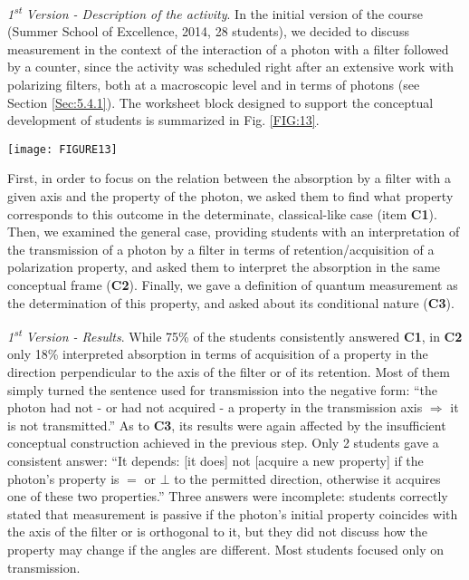 \documentclass[twocolumn,secnumarabic,amssymb, nobibnotes, aps, prd, nofootinbib]{revtex4-2}
\begin{document}
\emph{1\textsuperscript{st} Version - Description of the activity}. In the initial version of the course (Summer School of Excellence, 2014, 28 students), we decided to discuss measurement in the context of the interaction of a photon with a filter followed by a counter, since the activity was scheduled right after an extensive work with polarizing filters, both at a macroscopic level and in terms of photons (see Section \ref{Sec:5.4.1}). The worksheet block designed to support the conceptual development of students is summarized in Fig. \ref{FIG:13}.
\begin{figure*}[!htpb]
       \texttt{[image: FIGURE13]}
    \caption{Worksheet block on quantum measurement: 2014 version. The correct answers are in green.}
    \label{FIG:13}
\end{figure*}
First, in order to focus on the relation between the absorption by a filter with a given axis and the property of the photon, we asked them to find what property corresponds to this outcome in the determinate, classical-like case (item \textbf{C1}). Then, we examined the general case, providing students with an interpretation of the transmission of a photon by a filter in terms of retention/acquisition of a polarization property, and asked them to interpret the absorption in the same conceptual frame (\textbf{C2}). Finally, we gave a definition of quantum measurement as the determination of this property, and asked about its conditional nature (\textbf{C3}).

\emph{1\textsuperscript{st} Version - Results}. While 75\% of the students consistently answered \textbf{C1}, in \textbf{C2} only 18\% interpreted absorption in terms of acquisition of a property in the direction perpendicular to the axis of the filter or of its retention. Most of them simply turned the sentence used for transmission into the negative form: ``the photon had not - or had not acquired - a property in the transmission axis $\Rightarrow$ it is not transmitted.'' As to \textbf{C3}, its results were again affected by the insufficient conceptual construction achieved in the previous step. Only 2 students gave a consistent answer: ``It depends: [it does] not [acquire a new property] if the photon's property is $=$ or $\bot$ to the permitted direction, otherwise it acquires one of these two properties.'' Three answers were incomplete: students correctly stated that measurement is passive if the photon's initial property coincides with the axis of the filter or is orthogonal to it, but they did not discuss how the property may change if the angles are different. Most students focused only on transmission.
\end{document}
